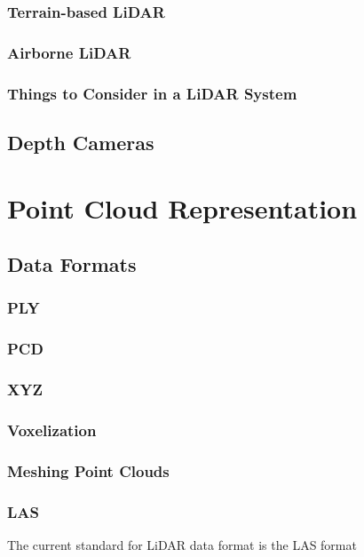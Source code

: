 \subsubsection{Terrain-based LiDAR}

\subsubsection{Airborne LiDAR}

\subsubsection{Things to Consider in a LiDAR System}

\subsection{Depth Cameras}

\section{Point Cloud Representation}

\subsection{Data Formats}

\subsubsection{PLY}

\subsubsection{PCD}

\subsubsection{XYZ}

\subsubsection{Voxelization}

\subsubsection{Meshing Point Clouds}


\subsubsection{LAS}
The current standard for LiDAR data format is the LAS format

